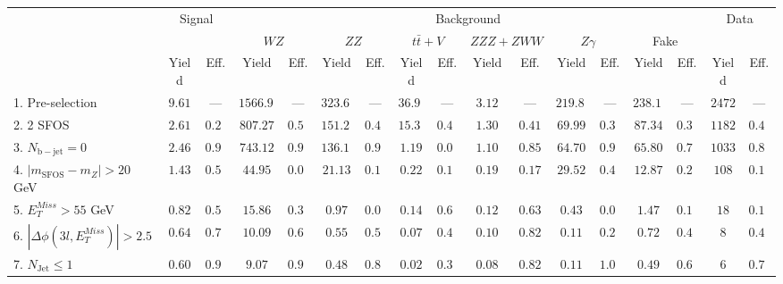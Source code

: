 \begin{tabular}{l||c|c||c|c||c|c||c|c||c|c||c|c||c|c||c|c}
\hline
 &                 \multicolumn{2}{c||}{Signal}            &  \multicolumn{12}{c||}{Background} &  \multicolumn{2}{c}{Data} \\
 & &  & \multicolumn{2}{c||}{$WZ$} & \multicolumn{2}{c||}{$ZZ$} & \multicolumn{2}{c||}{$t\bar{t}+V$} & \multicolumn{2}{c||}{$ZZZ+ZWW$} & \multicolumn{2}{c||}{$Z\gamma$} & \multicolumn{2}{c||}{Fake} &  & \\ 
 & Yield & Eff. & Yield & Eff. & Yield & Eff. & Yield & Eff. & Yield & Eff. & Yield & Eff. & Yield & Eff.  & Yield & Eff.\\
\hline\hline
1. Pre-selection &  $9.61$ & --- &  $1566.91$ & --- &  $323.60$ & --- &  $36.93$ & --- &  $3.12$ & --- &  $219.80$ & --- &  $238.12$ & ---  & $2472$ &  --- \\ 
\hline
2. 2 SFOS &  $2.61$ &  $0.27$ &  $807.27$ &  $0.52$ &  $151.28$ &  $0.47$ &  $15.35$ &  $0.42$ &  $1.30$ &  $0.41$ &  $69.99$ &  $0.32$ &  $87.34$ &  $0.37$ & $1182$ &  $0.48$\\ 
\hline
3. $N_{\mathrm{b-jet}}=0$ &  $2.46$ &  $0.94$ &  $743.12$ &  $0.92$ &  $136.16$ &  $0.90$ &  $1.19$ &  $0.08$ &  $1.10$ &  $0.85$ &  $64.70$ &  $0.92$ &  $65.80$ &  $0.75$ & $1033$ &  $0.87$\\ 
\hline
4. $| m_{\mathrm{SFOS}} - m_Z | >  20$ GeV &  $1.43$ &  $0.58$ &  $44.95$ &  $0.06$ &  $21.13$ &  $0.16$ &  $0.22$ &  $0.18$ &  $0.19$ &  $0.17$ &  $29.52$ &  $0.46$ &  $12.87$ &  $0.20$ & $108$ &  $0.10$\\ 
\hline
5. $E_{T}^{Miss} > 55$ GeV &  $0.82$ &  $0.57$ &  $15.86$ &  $0.35$ &  $0.97$ &  $0.05$ &  $0.14$ &  $0.65$ &  $0.12$ &  $0.63$ &  $0.43$ &  $0.01$ &  $1.47$ &  $0.11$ & $18$ &  $0.17$\\ 
\hline
6. $|\Delta\phi(3l,E_{T}^{Miss})| > 2.5$ &  $0.64$ &  $0.78$ &  $10.09$ &  $0.64$ &  $0.55$ &  $0.57$ &  $0.07$ &  $0.49$ &  $0.10$ &  $0.82$ &  $0.11$ &  $0.25$ &  $0.72$ &  $0.49$ & $8$ &  $0.44$\\ 
\hline
7. $N_{\mathrm{Jet}} \leq 1$ &  $0.60$ &  $0.94$ &  $9.07$ &  $0.90$ &  $0.48$ &  $0.86$ &  $0.02$ &  $0.35$ &  $0.08$ &  $0.82$ &  $0.11$ &  $1.00$ &  $0.49$ &  $0.69$ & $6$ &  $0.75$\\ 
\hline
\end{tabular}

